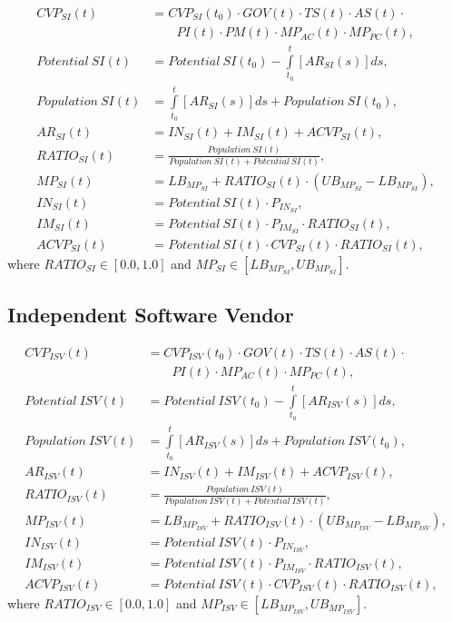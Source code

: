 \begin{align}
		CVP_{SI}(t) &= CVP_{SI}(t_0) \cdot GOV(t) \cdot TS(t) \cdot AS(t) \cdot \nonumber \\ &\qquad PI(t) \cdot PM(t) \cdot MP_{AC}(t) \cdot MP_{PC}(t),\\
		\mathit{Potential~SI(t)} &=\mathit{Potential~SI(t_0)} - \int\limits_{t_0}^t  [AR_{SI}(s)]ds,\\
		\mathit{Population~SI(t)} &= \int\limits_{t_0}^t [AR_{SI}(s)]ds + \mathit{Population~SI(t_0)},\\
		AR_{SI}(t) &= IN_{SI}(t) + IM_{SI}(t) + ACVP_{SI}(t),\\
		RATIO_{SI}(t) &= \frac{\mathit{Population~SI(t)}}{\mathit{Population~SI(t)} + \mathit{Potential~SI(t)}},\\
		MP_{SI}(t) &= LB_{MP_{SI}} + RATIO_{SI}(t) \cdot (UB_{MP_{SI}} - LB_{MP_{SI}}),\\
		IN_{SI}(t) &= \mathit{Potential~SI(t)} \cdot P_{IN_{SI}},\\
		IM_{SI}(t) &= \mathit{Potential~SI(t)} \cdot P_{IM_{SI}} \cdot RATIO_{SI}(t),\\
		ACVP_{SI}(t) &= \mathit{Potential~SI(t)} \cdot CVP_{SI}(t) \cdot RATIO_{SI}(t),
\end{align}
where $RATIO_{SI} \in [0.0,1.0]$ and $MP_{SI} \in [LB_{MP_{SI}},UB_{MP_{SI}}]$.

\subsection{Independent Software Vendor}\label{ch:app04:csf:isv}

\begin{align}
		CVP_{ISV}(t) &= CVP_{ISV}(t_0) \cdot GOV(t) \cdot TS(t) \cdot AS(t) \cdot \nonumber \\ &\qquad PI(t) \cdot MP_{AC}(t) \cdot MP_{PC}(t),\\
		\mathit{Potential~ISV(t)} &= \mathit{Potential~ISV(t_0)} - \int\limits_{t_0}^t  [AR_{ISV}(s)]ds,\\
		\mathit{Population~ISV(t)} &= \int\limits_{t_0}^t [AR_{ISV}(s)]ds + \mathit{Population~ISV(t_0)},\\
		AR_{ISV}(t) &= IN_{ISV}(t) + IM_{ISV}(t) + ACVP_{ISV}(t),\\
		RATIO_{ISV}(t) &= \frac{\mathit{Population~ISV(t)}}{\mathit{Population~ISV(t)} + \mathit{Potential~ISV(t)}},\label{eq:isv:ratio}\\
		MP_{ISV}(t) &= LB_{MP_{ISV}} + RATIO_{ISV}(t) \cdot (UB_{MP_{ISV}} - LB_{MP_{ISV}}),\label{eq:mp:isv}\\
		IN_{ISV}(t) &= \mathit{Potential~ISV(t)} \cdot P_{IN_{ISV}},\\
		IM_{ISV}(t) &= \mathit{Potential~ISV(t)} \cdot P_{IM_{ISV}} \cdot RATIO_{ISV}(t),\\
		ACVP_{ISV}(t) &= \mathit{Potential~ISV(t)} \cdot CVP_{ISV}(t) \cdot RATIO_{ISV}(t),
\end{align}
where $RATIO_{ISV} \in [0.0,1.0]$ and $MP_{ISV} \in [LB_{MP_{ISV}},UB_{MP_{ISV}}]$.

